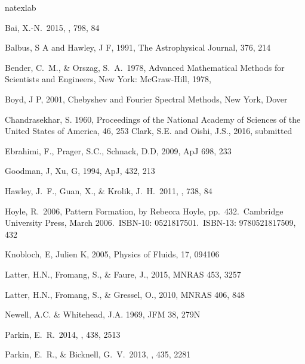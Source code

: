 \documentclass{emulateapj}
\begin{document}


\begin{thebibliography}{53}
\expandafter\ifx\csname natexlab\endcsname\relax\def\natexlab#1{#1}\fi

 Bai, X.-N.\ 2015, \apj, 798, 84 

Balbus, S A and Hawley, J F, 1991, The Astrophysical Journal, 376, 214

 Bender, C.~M., \& Orszag, S.~A.\ 1978, Advanced Mathematical Methods for Scientists and Engineers, New York: McGraw-Hill, 1978,

Boyd, J P, 2001, Chebyshev and Fourier Spectral Methods, New York, Dover

Chandrasekhar, S. 1960, Proceedings of the National Academy of Sciences of the United States of America, 46, 253
Clark, S.E. and Oishi, J.S., 2016, submitted

Ebrahimi, F., Prager, S.C., Schnack, D.D, 2009, ApJ 698, 233

Goodman, J, Xu, G, 1994, ApJ, 432, 213

 Hawley, J.~F., Guan, X., \& Krolik, J.~H.\ 2011, \apj, 738, 84 

 Hoyle, R.\ 2006, Pattern
  Formation, by Rebecca Hoyle, pp.~432.~Cambridge University Press,
  March 2006.~ISBN-10: 0521817501.~ISBN-13: 9780521817509, 432

Knobloch, E, Julien K, 2005, Physics of Fluids, 17, 094106

Latter, H.N., Fromang, S., \& Faure, J., 2015, MNRAS 453, 3257

Latter, H.N., Fromang, S., \& Gressel, O., 2010, MNRAS 406, 848

Newell, A.C. \& Whitehead, J.A. 1969, JFM 38, 279N

 Parkin, E.~R.\ 2014, \mnras, 438, 2513 

 Parkin, E.~R., \& Bicknell, G.~V.\ 2013, \mnras, 435, 2281 


\end{thebibliography}
\end{document}
